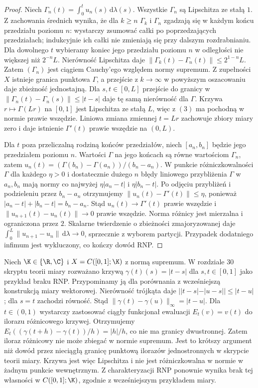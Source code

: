 \begin{proof}
Niech $\Gamma_n(t)=\int_0^t u_n(s)\,\mathrm d\lambda(s)$.
Wszystkie $\Gamma_n$ są Lipschitza ze stałą $1$.
Z zachowania średnich wynika, że dla $k\ge n$
$\Gamma_k$ i $\Gamma_n$ zgadzają się w każdym końcu
przedziału poziomu $n$: wystarczy zsumować całki
po poprzedzających przedziałach; indukcyjnie ich
całki nie zmieniają się przy dalszym rozdrabnianiu.
Dla dowolnego $t$ wybieramy koniec jego przedziału
poziomu $n$ w odległości nie większej niż $2^{-n}L$.
Nierówność Lipschitza daje
$\|\Gamma_k(t)-\Gamma_n(t)\|\le2^{1-n}L$.
Zatem $(\Gamma_n)$ jest ciągiem Cauchy'ego względem
normy supremum. Z zupełności $X$ istnieje granica
punktowa $\Gamma$, a przejście z $k\to\infty$ w
powyższym oszacowaniu daje zbieżność jednostajną.
Dla $s,t\in[0,L]$ przejście do granicy w
$\|\Gamma_n(t)-\Gamma_n(s)\|\le|t-s|$
daje tę samą nierówność dla $\Gamma$. Krzywa
$r\mapsto\Gamma(Lr)$ na $[0,1]$ jest Lipschitza ze
stałą $L$, więc z $(3)$ ma pochodną w normie prawie
wszędzie. Liniowa zmiana zmiennej $t=Lr$ zachowuje
zbiory miary zero i daje istnienie $\Gamma'(t)$
prawie wszędzie na $(0,L)$.

Dla $t$ poza przeliczalną rodziną końców przedziałów,
niech $[a_n,b_n]$ będzie jego przedziałem poziomu $n$.
Wartości $\Gamma$ na jego końcach są równe
wartościom $\Gamma_n$, zatem
$u_n(t)=(\Gamma(b_n)-\Gamma(a_n))/(b_n-a_n)$.
W punkcie różniczkowalności $\Gamma$ dla każdego
$\eta>0$ i dostatecznie dużego $n$ błędy liniowego
przybliżenia $\Gamma$ w $a_n,b_n$ mają normy co najwyżej
$\eta|a_n-t|$ i $\eta|b_n-t|$. Po odjęciu przybliżeń
i podzieleniu przez $b_n-a_n$ otrzymujemy
$\|u_n(t)-\Gamma'(t)\|\le\eta$, ponieważ
$|a_n-t|+|b_n-t|=b_n-a_n$.
Stąd $u_n(t)\to\Gamma'(t)$ prawie wszędzie i
$\|u_{n+1}(t)-u_n(t)\|\to0$ prawie wszędzie.
Norma różnicy jest mierzalna i ograniczona przez $2$.
Skalarne twierdzenie o zbieżności zmajoryzowanej daje
$\int_0^L\|u_{n+1}-u_n\|\,\mathrm d\lambda\to0$,
sprzecznie z wyborem partycji. Przypadek dodatniego
infimum jest wykluczony, co kończy dowód RNP.
\end{proof}

\begin{przyklad}
\label{ex:lipschitz-no-derivative15b}
Niech $\K\in\{\R,\C\}$ i $X=C([0,1];\K)$ z normą
supremum. W rozdziale 30 skryptu teorii miary
rozważano krzywą $\gamma(t)(s)=|t-s|$ dla $s,t\in[0,1]$
jako przykład braku RNP. Przypominamy ją dla porównania
z wcześniejszą konstrukcją miary wektorowej.
Nierówność trójkąta daje
$||t-s|-|u-s||\le|t-u|$; dla $s=t$ zachodzi równość.
Stąd $\|\gamma(t)-\gamma(u)\|_\infty=|t-u|$.
Dla $t\in(0,1)$ wystarczy zastosować ciągły
funkcjonał ewaluacji $E_t(v)=v(t)$ do ilorazu
różnicowego krzywej. Otrzymujemy
$E_t((\gamma(t+h)-\gamma(t))/h)=|h|/h$,
co nie ma granicy dwustronnej. Zatem iloraz różnicowy
nie może zbiegać w normie supremum. Jest to krótszy
argument niż dowód przez nieciągłą granicę punktową
ilorazów jednostronnych w skrypcie teorii miary.
Krzywa jest więc Lipschitza i nie jest różniczkowalna
w normie w żadnym punkcie wewnętrznym.
Z charakteryzacji RNP ponownie wynika brak tej własności
w $C([0,1];\K)$, zgodnie z wcześniejszym przykładem miary.
\end{przyklad}

